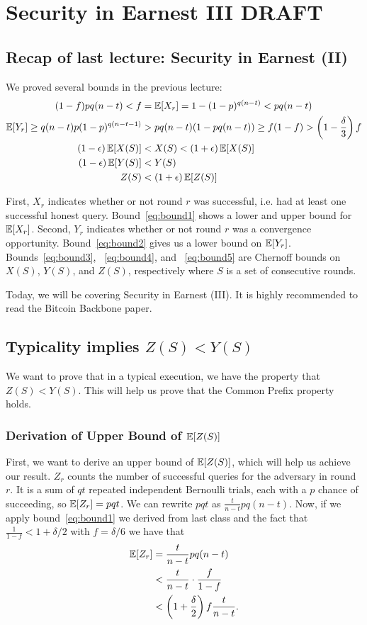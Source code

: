 \chapter{Security in Earnest III \small{\textsf{DRAFT}}}\label{chapter:earnest3}

\section{Recap of last lecture: Security in Earnest (II)}
We proved several bounds in the previous lecture:
\begin{align}
(1-f)pq(n-t) < f &= \operatorname{\mathbb{E}}[X_r] = 1 - (1-p)^{q(n-t)} < pq(n-t)\label{eq:bound1}\\
\operatorname{\mathbb{E}}[Y_r] \geq q(n-t)p(1-p)^{q(n-t-1)} &> pq(n-t)(1-pq(n-t)) \geq f(1-f) > \left(1-\frac{\delta}{3}\right)f \label{eq:bound2}\\
(1-\epsilon)\operatorname{\mathbb{E}}[X(S)] &< X(S) < (1+\epsilon)\operatorname{\mathbb{E}}[X(S)]\label{eq:bound3}\\
 (1-\epsilon)\operatorname{\mathbb{E}}[Y(S)] &< Y(S)\label{eq:bound4}\\
Z(S) &< (1+\epsilon)\operatorname{\mathbb{E}}[Z(S)]\label{eq:bound5}
\end{align}

 First, $X_r$ indicates whether or not round $r$ was successful, i.e. had at least one successful honest query. Bound~\ref{eq:bound1} shows a lower and upper bound for $\mathbb{E}[X_r]$.
 Second, $Y_r$ indicates whether or not round $r$ was a convergence opportunity. Bound~\ref{eq:bound2} gives us a lower bound on $\mathbb{E}[Y_r]$. Bounds~\ref{eq:bound3}, ~\ref{eq:bound4}, and ~\ref{eq:bound5} are Chernoff bounds on $X(S)$, $Y(S)$, and $Z(S)$, respectively where $S$ is a set of consecutive rounds.

 Today, we will be covering Security in Earnest (III). It is highly recommended to read the Bitcoin Backbone paper.

\section{Typicality implies $Z(S) < Y(S)$}
We want to prove that in a typical execution, we have the property that $Z(S) < Y(S)$. This will help us prove that the Common Prefix property holds.

\subsection{Derivation of Upper Bound of $\mathbb{E}[Z(S)]$}
First, we want to derive an upper bound of $\mathbb{E}[Z(S)]$, which will help us achieve our result.
$Z_r$ counts the number of successful queries for the adversary in round $r$. It is a sum of $qt$ repeated independent Bernoulli trials, each with a $p$ chance of succeeding, so $\operatorname{\mathbb{E}}[Z_r] = pqt$. We can rewrite $pqt$ as $\frac{t}{n-t} pq(n-t)$. Now, if we apply bound~\ref{eq:bound1} we derived from last class and the fact that $\frac{1}{1-f} < 1 + \delta/2$ with $f = \delta/6$ we have that
\begin{align}\operatorname{\mathbb{E}}[Z_r] &= \frac{t}{n-t} pq(n-t) \\
&< \frac{t}{n-t} \cdot \frac{f}{1-f}\\
&< \left(1 + \frac{\delta}{2}\right)f \frac{t}{n-t}.\label{eq:zexpupper}
\end{align}

